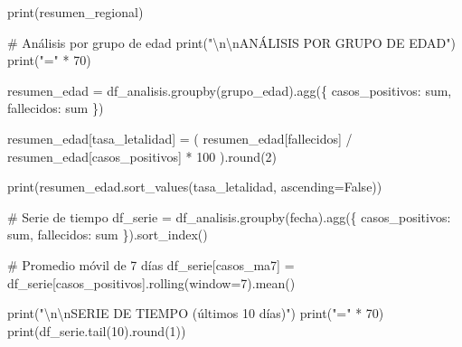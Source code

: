 \documentclass[
  doc,
  floatsintext,
  longtable,
  a4paper,
  nolmodern,
  notxfonts,
  notimes,
  12pt,
  colorlinks=true,linkcolor=blue,citecolor=blue,urlcolor=blue]{apa7}
\newenvironment{Shaded}{\begin{snugshade}}{\end{snugshade}}
\newcommand{\BuiltInTok}[1]{\textcolor[rgb]{0.00,0.23,0.31}{#1}}
\newcommand{\CharTok}[1]{\textcolor[rgb]{0.13,0.47,0.30}{#1}}
\newcommand{\CommentTok}[1]{\textcolor[rgb]{0.37,0.37,0.37}{#1}}
\newcommand{\DecValTok}[1]{\textcolor[rgb]{0.68,0.00,0.00}{#1}}
\newcommand{\NormalTok}[1]{\textcolor[rgb]{0.00,0.23,0.31}{#1}}
\newcommand{\OperatorTok}[1]{\textcolor[rgb]{0.37,0.37,0.37}{#1}}
\newcommand{\StringTok}[1]{\textcolor[rgb]{0.13,0.47,0.30}{#1}}
\newcommand{\VariableTok}[1]{\textcolor[rgb]{0.07,0.07,0.07}{#1}}
\begin{document}
\begin{Shaded}
\begin{Highlighting}[]
\BuiltInTok{print}\NormalTok{(resumen\_regional)}

\CommentTok{\# Análisis por grupo de edad}
\BuiltInTok{print}\NormalTok{(}\StringTok{"}\CharTok{\textbackslash{}n\textbackslash{}n}\StringTok{ANÁLISIS POR GRUPO DE EDAD"}\NormalTok{)}
\BuiltInTok{print}\NormalTok{(}\StringTok{"="} \OperatorTok{*} \DecValTok{70}\NormalTok{)}

\NormalTok{resumen\_edad }\OperatorTok{=}\NormalTok{ df\_analisis.groupby(}\StringTok{\textquotesingle{}grupo\_edad\textquotesingle{}}\NormalTok{).agg(\{}
    \StringTok{\textquotesingle{}casos\_positivos\textquotesingle{}}\NormalTok{: }\StringTok{\textquotesingle{}sum\textquotesingle{}}\NormalTok{,}
    \StringTok{\textquotesingle{}fallecidos\textquotesingle{}}\NormalTok{: }\StringTok{\textquotesingle{}sum\textquotesingle{}}
\NormalTok{\})}

\NormalTok{resumen\_edad[}\StringTok{\textquotesingle{}tasa\_letalidad\textquotesingle{}}\NormalTok{] }\OperatorTok{=}\NormalTok{ (}
\NormalTok{    resumen\_edad[}\StringTok{\textquotesingle{}fallecidos\textquotesingle{}}\NormalTok{] }\OperatorTok{/}\NormalTok{ resumen\_edad[}\StringTok{\textquotesingle{}casos\_positivos\textquotesingle{}}\NormalTok{] }\OperatorTok{*} \DecValTok{100}
\NormalTok{).}\BuiltInTok{round}\NormalTok{(}\DecValTok{2}\NormalTok{)}

\BuiltInTok{print}\NormalTok{(resumen\_edad.sort\_values(}\StringTok{\textquotesingle{}tasa\_letalidad\textquotesingle{}}\NormalTok{, ascending}\OperatorTok{=}\VariableTok{False}\NormalTok{))}

\CommentTok{\# Serie de tiempo}
\NormalTok{df\_serie }\OperatorTok{=}\NormalTok{ df\_analisis.groupby(}\StringTok{\textquotesingle{}fecha\textquotesingle{}}\NormalTok{).agg(\{}
    \StringTok{\textquotesingle{}casos\_positivos\textquotesingle{}}\NormalTok{: }\StringTok{\textquotesingle{}sum\textquotesingle{}}\NormalTok{,}
    \StringTok{\textquotesingle{}fallecidos\textquotesingle{}}\NormalTok{: }\StringTok{\textquotesingle{}sum\textquotesingle{}}
\NormalTok{\}).sort\_index()}

\CommentTok{\# Promedio móvil de 7 días}
\NormalTok{df\_serie[}\StringTok{\textquotesingle{}casos\_ma7\textquotesingle{}}\NormalTok{] }\OperatorTok{=}\NormalTok{ df\_serie[}\StringTok{\textquotesingle{}casos\_positivos\textquotesingle{}}\NormalTok{].rolling(window}\OperatorTok{=}\DecValTok{7}\NormalTok{).mean()}

\BuiltInTok{print}\NormalTok{(}\StringTok{"}\CharTok{\textbackslash{}n\textbackslash{}n}\StringTok{SERIE DE TIEMPO (últimos 10 días)"}\NormalTok{)}
\BuiltInTok{print}\NormalTok{(}\StringTok{"="} \OperatorTok{*} \DecValTok{70}\NormalTok{)}
\BuiltInTok{print}\NormalTok{(df\_serie.tail(}\DecValTok{10}\NormalTok{).}\BuiltInTok{round}\NormalTok{(}\DecValTok{1}\NormalTok{))}
\end{Highlighting}
\end{Shaded}
\end{document}
